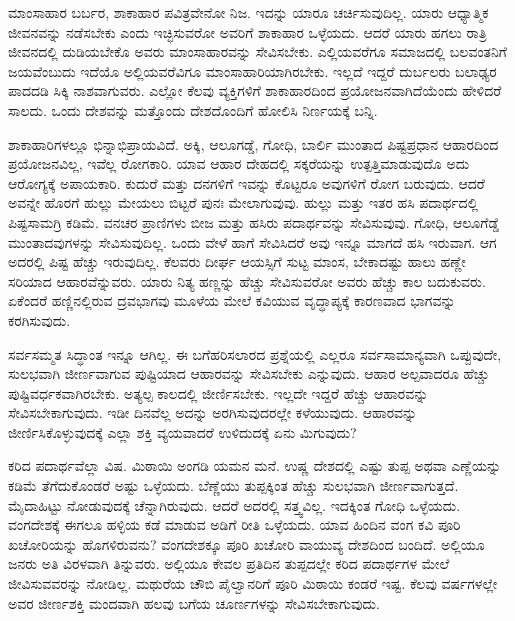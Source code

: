 ಮಾಂಸಾಹಾರ ಬರ್ಬರ, ಶಾಕಾಹಾರ ಪವಿತ್ರವೇನೋ ನಿಜ. ಇದನ್ನು ಯಾರೂ ಚರ್ಚಿಸುವುದಿಲ್ಲ. ಯಾರು ಆಧ್ಯಾತ್ಮಿಕ ಜೀವನವನ್ನು ನಡೆಸಬೇಕು ಎಂದು ಇಚ್ಛಿಸುವರೋ ಅವರಿಗೆ ಶಾಕಾಹಾರ ಒಳ್ಳೆಯದು. ಆದರೆ ಯಾರು ಹಗಲು ರಾತ್ರಿ ಜೀವನದಲ್ಲಿ ದುಡಿಯ\break ಬೇಕೊ ಅವರು ಮಾಂಸಾಹಾರವನ್ನು ಸೇವಿಸಬೇಕು. ಎಲ್ಲಿಯವರೆಗೂ ಸಮಾಜದಲ್ಲಿ ಬಲವಂತನಿಗೆ ಜಯವೆಂಬುದು ಇದೆಯೊ ಅಲ್ಲಿಯವರೆವಿಗೂ ಮಾಂಸಾಹಾರಿಯಾಗಿರಬೇಕು. ಇಲ್ಲದೆ ಇದ್ದರೆ ದುರ್ಬಲರು ಬಲಾಢ್ಯರ ಪಾದದಡಿ ಸಿಕ್ಕಿ ನಾಶವಾಗುವರು. ಎಲ್ಲೋ ಕೆಲವು ವ್ಯಕ್ತಿಗಳಿಗೆ ಶಾಕಾಹಾರದಿಂದ ಪ್ರಯೋಜನವಾಗಿದೆಯೆಂದು ಹೇಳಿದರೆ ಸಾಲದು. ಒಂದು ದೇಶವನ್ನು ಮತ್ತೊಂದು ದೇಶದೊಂದಿಗೆ ಹೋಲಿಸಿ ನಿರ್ಣಯಕ್ಕೆ ಬನ್ನಿ.

ಶಾಕಾಹಾರಿಗಳಲ್ಲೂ ಭಿನ್ನಾಭಿಪ್ರಾಯವಿದೆ. ಅಕ್ಕಿ, ಆಲೂಗಡ್ಡೆ, ಗೋಧಿ, ಬಾರ್ಲಿ ಮುಂತಾದ ಪಿಷ್ಟಪ್ರಧಾನ ಆಹಾರದಿಂದ ಪ್ರಯೋಜನವಿಲ್ಲ, ಇವೆಲ್ಲ ರೋಗಕಾರಿ. ಯಾವ ಆಹಾರ ದೇಹದಲ್ಲಿ ಸಕ್ಕರೆಯನ್ನು ಉತ್ಪತ್ತಿಮಾಡುವುದೊ ಅದು ಆರೋಗ್ಯಕ್ಕೆ ಅಪಾಯಕಾರಿ. ಕುದುರೆ ಮತ್ತು ದನಗಳಿಗೆ ಇವನ್ನು ಕೊಟ್ಟರೂ ಅವುಗಳಿಗೆ ರೋಗ ಬರುವುದು. ಆದರೆ ಅವನ್ನೇ ಹೊರಗೆ ಹುಲ್ಲು ಮೇಯಲು ಬಿಟ್ಟರೆ ಪುನಃ ಮೇಲಾಗುವುವು. ಹುಲ್ಲು ಮತ್ತು ಇತರ ಹಸಿ ಪದಾರ್ಥದಲ್ಲಿ ಪಿಷ್ಟಸಾಮಗ್ರಿ ಕಡಿಮೆ. ವನಚರ ಪ್ರಾಣಿಗಳು ಬೀಜ ಮತ್ತು ಹಸಿರು ಪದಾರ್ಥವನ್ನು ಸೇವಿಸುವುವು. ಗೋಧಿ, ಆಲೂಗೆಡ್ಡೆ ಮುಂತಾದವುಗಳನ್ನು ಸೇವಿಸುವುದಿಲ್ಲ. ಒಂದು ವೇಳೆ ಹಾಗೆ ಸೇವಿಸಿದರೆ ಅವು ಇನ್ನೂ ಮಾಗದೆ ಹಸಿ ಇರುವಾಗ. ಆಗ ಅದರಲ್ಲಿ ಪಿಷ್ಟ ಹೆಚ್ಚು ಇರುವುದಿಲ್ಲ. ಕೆಲವರು ದೀರ್ಘ ಆಯಸ್ಸಿಗೆ ಸುಟ್ಟ ಮಾಂಸ, ಬೇಕಾದಷ್ಟು ಹಾಲು ಹಣ್ಣೇ ಸರಿಯಾದ ಆಹಾರವೆನ್ನುವರು. ಯಾರು ನಿತ್ಯ ಹಣ್ಣನ್ನು ಹೆಚ್ಚು ಸೇವಿಸುವರೋ ಅವರು ಹೆಚ್ಚು ಕಾಲ ಬದುಕುವರು. ಏಕೆಂದರೆ ಹಣ್ಣಿನಲ್ಲಿರುವ ದ್ರವಭಾಗವು ಮೂಳೆಯ ಮೇಲೆ ಕವಿಯುವ ವೃದ್ಧಾಪ್ಯಕ್ಕೆ ಕಾರಣವಾದ ಭಾಗವನ್ನು ಕರಗಿಸುವುದು.

ಸರ್ವಸಮ್ಮತ ಸಿದ್ಧಾಂತ ಇನ್ನೂ ಆಗಿಲ್ಲ. ಈ ಬಗೆಹರಿಸಲಾರದ ಪ್ರಶ್ನೆಯಲ್ಲಿ ಎಲ್ಲರೂ ಸರ್ವಸಾಮಾನ್ಯವಾಗಿ ಒಪ್ಪುವುದೇ, ಸುಲಭವಾಗಿ ಜೀರ್ಣವಾಗುವ ಪುಷ್ಟಿಯಾದ ಆಹಾರವನ್ನು ಸೇವಿಸಬೇಕು ಎನ್ನುವುದು. ಆಹಾರ ಅಲ್ಪವಾದರೂ ಹೆಚ್ಚು ಪುಷ್ಟಿವರ್ಧಕವಾಗಿರಬೇಕು. ಅತ್ಯಲ್ಪ ಕಾಲದಲ್ಲಿ ಜೀರ್ಣಿಸಬೇಕು. ಇಲ್ಲದೇ ಇದ್ದರೆ ಹೆಚ್ಚು ಆಹಾರವನ್ನು ಸೇವಿಸಬೇಕಾಗು\break ವುದು. ಇಡೀ ದಿನವೆಲ್ಲ ಅದನ್ನು ಅರಗಿಸುವುದರಲ್ಲೇ ಕಳೆಯುವುದು. ಆಹಾರವನ್ನು ಜೀರ್ಣಿಸಿಕೊಳ್ಳುವುದಕ್ಕೆ ಎಲ್ಲಾ ಶಕ್ತಿ ವ್ಯಯವಾದರೆ ಉಳಿದುದಕ್ಕೆ ಏನು ಮಿಗುವುದು?

ಕರಿದ ಪದಾರ್ಥವೆಲ್ಲಾ ವಿಷ. ಮಿಠಾಯಿ ಅಂಗಡಿ ಯಮನ ಮನೆ. ಉಷ್ಣ ದೇಶದಲ್ಲಿ ಎಷ್ಟು ತುಪ್ಪ ಅಥವಾ ಎಣ್ಣೆಯನ್ನು ಕಡಿಮೆ ತೆಗೆದುಕೊಂಡರೆ ಅಷ್ಟು ಒಳ್ಳೆಯದು. ಬೆಣ್ಣೆಯು ತುಪ್ಪಕ್ಕಿಂತ ಹೆಚ್ಚು ಸುಲಭವಾಗಿ ಜೀರ್ಣವಾಗುತ್ತದೆ. ಮೈದಾಹಿಟ್ಟು ನೋಡುವುದಕ್ಕೆ ಚೆನ್ನಾಗಿರುವುದು. ಆದರೆ ಅದರಲ್ಲಿ ಸತ್ತ್ವವಿಲ್ಲ. ಇದಕ್ಕಿಂತ ಗೋಧಿ ಒಳ್ಳೆಯದು. ವಂಗದೇಶಕ್ಕೆ ಈಗಲೂ ಹಳ್ಳಿಯ ಕಡೆ ಮಾಡುವ ಅಡಿಗೆ ರೀತಿ ಒಳ್ಳೆಯದು. ಯಾವ ಹಿಂದಿನ ವಂಗ ಕವಿ ಪೂರಿ ಖಚೋರಿಯನ್ನು ಹೊಗಳಿರುವನು? ವಂಗದೇಶಕ್ಕೂ ಪೂರಿ ಖಚೋರಿ ವಾಯುವ್ಯ ದೇಶದಿಂದ ಬಂದಿದೆ. ಅಲ್ಲಿಯೂ ಜನರು ಅತಿ ವಿರಳವಾಗಿ ತಿನ್ನುವರು. ಅಲ್ಲಿಯೂ ಕೇವಲ ಪ್ರತಿದಿನ ತುಪ್ಪದಲ್ಲೇ ಕರಿದ ಪದಾರ್ಥಗಳ ಮೇಲೆ ಜೀವಿಸುವವರನ್ನು ನೋಡಿಲ್ಲ. ಮಥುರೆಯ ಚೌಬಿ ಪೈಲ್ವಾನರಿಗೆ ಪೂರಿ ಮಿಠಾಯಿ ಕಂಡರೆ ಇಷ್ಟ. ಕೆಲವು ವರ್ಷಗಳಲ್ಲೇ ಅವರ ಜೀರ್ಣಶಕ್ತಿ ಮಂದವಾಗಿ ಹಲವು ಬಗೆಯ ಚೂರ್ಣಗಳನ್ನು ಸೇವಿಸಬೇಕಾಗುವುದು.

